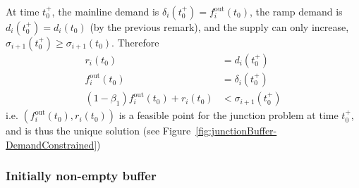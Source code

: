 At time $t_0^+$, the mainline demand is $\delta_i(t_0^+) = f_i^{\text{out}}(t_0)$, the ramp demand is $d_i(t_0^+) = d_i(t_0)$ (by the previous remark), and the supply can only increase, $\sigma_{i+1}(t_0^+) \geq \sigma_{i+1}(t_0)$. Therefore
\begin{align*}
r_i(t_0) &= d_i(t_0^+) \\
f_i^{\text{out}}(t_0) &= \delta_i(t_0^+) \\
(1-\beta_1)f_i^{\text{out}}(t_0) + r_i(t_0) &< \sigma_{i+1}(t_0^+)
\end{align*}
i.e. $(f_i^{\text{out}}(t_0), r_i(t_0))$ is a feasible point for the junction problem at time $t_0^+$, and is thus the unique solution (see Figure~\ref{fig:junctionBuffer-DemandConstrained})


\subsubsection{Initially non-empty buffer}



